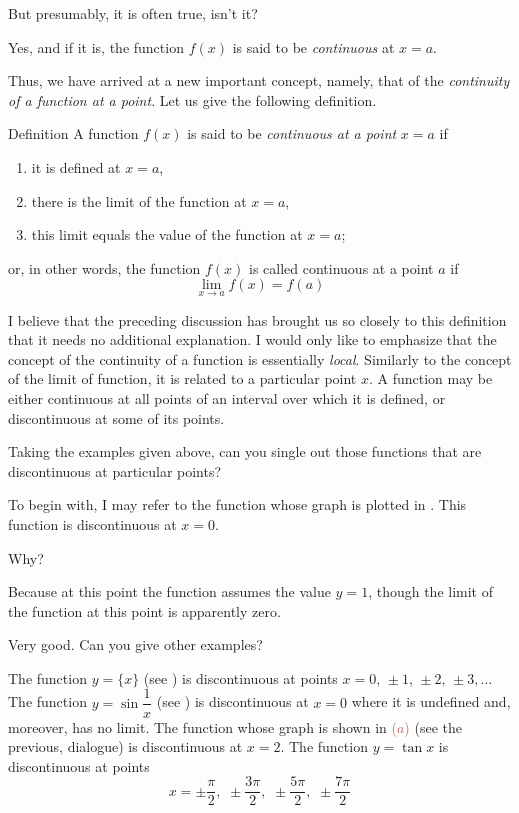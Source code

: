 {\rdr But presumably, it is often true, isn't it?

\athr Yes, and if it is, the function $f (x)$ is said to be \emph{continuous} at $x = a$.

Thus, we have arrived at a new important concept, namely, that of the \emph{continuity of a function at a point}. Let us give the following definition.
\begin{mytheo}{Definition}
A function $f (x)$ is said to be \emph{continuous at a point} $x = a$ if 
\begin{enumerate}[leftmargin=2cm,label=\protect\circled{\arabic*}]
\item it is defined at $x = a$, 
\item there is the limit of the function at $x = a$, 
\item this limit equals the value of the function at $x = a$;
\end{enumerate}
or, in other words, the function $f (x)$ is called continuous at a point $a$ if
\begin{equation*}%
\lim\limits_{x \to a} f(x) = f(a)
\end{equation*}
\end{mytheo}

I believe that the preceding discussion has brought us so closely to this definition that it needs no additional explanation. I would only like to emphasize that the concept of the continuity of a function is essentially \emph{local}. Similarly to the concept of the limit of function, it is related to a particular point $x$. A function may be either continuous at all points of an interval over which it is defined, or discontinuous at some of its points.

Taking the examples given above, can you single out those functions that are discontinuous at particular points?

\rdr To begin with, I may refer to the function whose graph is plotted in . This function is discontinuous at $x = 0$.

\athr Why?

\rdr Because at this point the function assumes the value $y = 1$, though the limit of the function at this point is apparently zero.

\athr Very good. Can you give other examples?

\rdr The function $y = \{x\}$ (see ) is discontinuous at points $x = 0, \,\pm 1, \, \pm2, \, \pm3, \ldots$ The function $y = \sin \dfrac{1}{x}$ (see ) is discontinuous at $x = 0$ where it is undefined and, moreover, has no limit. The function whose graph is shown in \textcolor{IndianRed}{($a$)} (see the previous, dialogue) is discontinuous at $x = 2$. The function $y = \tan x$ is discontinuous at points 
\begin{equation*}%
x = \pm \frac{\pi}{2}, \,\, \pm \frac{3\pi}{2}, \,\, \pm \frac{5\pi}{2}, \,\, \pm \frac{7 \pi}{2}
\end{equation*}

}
